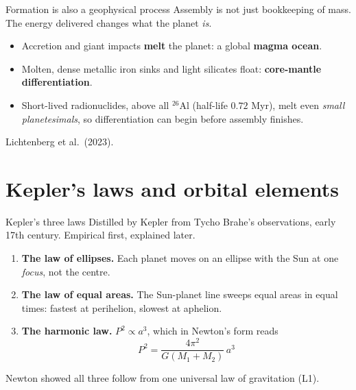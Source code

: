 \documentclass[aspectratio=169, 11pt]{beamer}
\begin{document}
\begin{frame}{Formation is also a geophysical process}
  Assembly is not just bookkeeping of mass. The energy delivered changes what the planet \emph{is}.
  \vskip4pt\relax
  \begin{itemize}
    \item Accretion and giant impacts \textbf{melt} the planet: a global \textbf{magma ocean}.
    \item Molten, dense metallic iron sinks and light silicates float: \textbf{core-mantle differentiation}.
    \item Short-lived radionuclides, above all $^{26}\mathrm{Al}$ (half-life $0.72$ Myr), melt even \emph{small planetesimals}, so differentiation can begin before assembly finishes.
  \end{itemize}
  \vskip4pt\relax
  \vskip2pt\relax
  {\footnotesize Lichtenberg et al.\ (2023).}
\end{frame}

\section{Kepler's laws and orbital elements}

\begin{frame}{Kepler's three laws}
  Distilled by Kepler from Tycho Brahe's observations, early 17th century. Empirical first, explained later.
  \vskip2pt\relax
  \begin{enumerate}
    \item \textbf{The law of ellipses.} Each planet moves on an ellipse with the Sun at one \emph{focus}, not the centre.
    \vskip2pt\relax
    \item \textbf{The law of equal areas.} The Sun-planet line sweeps equal areas in equal times: fastest at perihelion, slowest at aphelion.
    \vskip2pt\relax
    \item \textbf{The harmonic law.} $P^2 \propto a^3$, which in Newton's form reads
    \[
      P^2 = \frac{4\pi^2}{G(M_1 + M_2)}\, a^3
    \]
  \end{enumerate}
  \vskip2pt\relax
  Newton showed all three follow from one universal law of gravitation (L1).
  \vskip2pt\relax
\end{frame}
\end{document}
